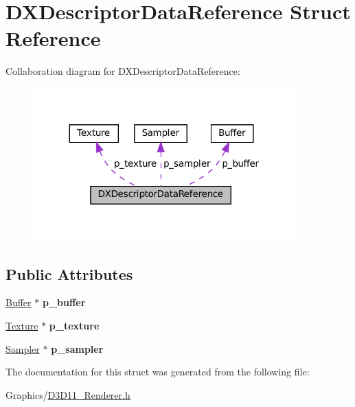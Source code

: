 \hypertarget{structDXDescriptorDataReference}{}\section{D\+X\+Descriptor\+Data\+Reference Struct Reference}
\label{structDXDescriptorDataReference}


Collaboration diagram for D\+X\+Descriptor\+Data\+Reference\+:
\nopagebreak
\begin{figure}[H]
\begin{center}
\leavevmode
\includegraphics[width=287pt]{structDXDescriptorDataReference__coll__graph}
\end{center}
\end{figure}
\subsection*{Public Attributes}
\begin{DoxyCompactItemize}
\item 
\mbox{\label{structDXDescriptorDataReference_a0076efe8a7e79cc0e8e4bdcda8d4fb55}} 
\hyperlink{classBuffer}{Buffer} $\ast$ {\bfseries p\+\_\+buffer}
\item 
\mbox{\label{structDXDescriptorDataReference_a6452f35f2369de86d19909ec25df26d3}} 
\hyperlink{classTexture}{Texture} $\ast$ {\bfseries p\+\_\+texture}
\item 
\mbox{\label{structDXDescriptorDataReference_a93f27eb64b37a8f22a8334b15452fe39}} 
\hyperlink{classSampler}{Sampler} $\ast$ {\bfseries p\+\_\+sampler}
\end{DoxyCompactItemize}


The documentation for this struct was generated from the following file\+:\begin{DoxyCompactItemize}
\item 
Graphics/\hyperlink{D3D11__Renderer_8h}{D3\+D11\+\_\+\+Renderer.\+h}\end{DoxyCompactItemize}
